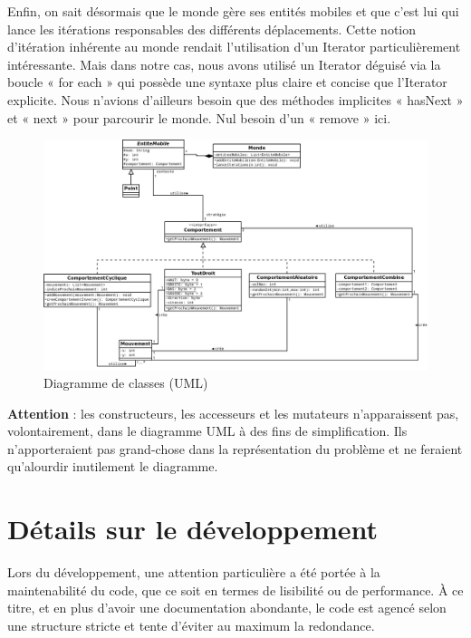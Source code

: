 \documentclass[a4paper,10pt]{report}
\begin{document}
Enfin, on sait désormais que le monde gère ses entités mobiles et que c'est lui qui lance les itérations responsables des différents déplacements. Cette notion d'itération inhérente au monde rendait l'utilisation d'un Iterator particulièrement intéressante. Mais dans notre cas, nous avons utilisé un Iterator déguisé via la boucle « for each » qui possède une syntaxe plus claire et concise que l'Iterator explicite. Nous n'avions d'ailleurs besoin que des méthodes implicites « hasNext » et « next » pour parcourir le monde. Nul besoin d'un « remove » ici.

\begin{landscape}
  \begin{figure}
  \begin{center}
    \includegraphics[scale=.4]{entitesMobiles.png}
  \end{center}
  \caption{Diagramme de classes (UML)}
  \end{figure}
\end{landscape}

\textbf{Attention} : les constructeurs, les accesseurs et les mutateurs n'apparaissent pas, volontairement, dans le diagramme UML à des fins de simplification. Ils n'apporteraient pas grand-chose dans la représentation du problème et ne feraient qu'alourdir inutilement le diagramme.

\section*{Détails sur le développement}

Lors du développement, une attention particulière a été portée à la maintenabilité du code, que ce soit en termes de lisibilité ou de performance. À ce titre, et en plus d'avoir une documentation abondante, le code est agencé selon une structure stricte et tente d'éviter au maximum la redondance.
\end{document}
